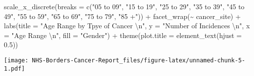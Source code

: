 \documentclass[
]{article}
\newenvironment{Shaded}{\begin{snugshade}}{\end{snugshade}}
\newcommand{\AttributeTok}[1]{\textcolor[rgb]{0.77,0.63,0.00}{#1}}
\newcommand{\FloatTok}[1]{\textcolor[rgb]{0.00,0.00,0.81}{#1}}
\newcommand{\FunctionTok}[1]{\textcolor[rgb]{0.00,0.00,0.00}{#1}}
\newcommand{\NormalTok}[1]{#1}
\newcommand{\SpecialCharTok}[1]{\textcolor[rgb]{0.00,0.00,0.00}{#1}}
\newcommand{\StringTok}[1]{\textcolor[rgb]{0.31,0.60,0.02}{#1}}
\begin{document}
\begin{Shaded}
\begin{Highlighting}[]
  \FunctionTok{scale\_x\_discrete}\NormalTok{(}\AttributeTok{breaks =} \FunctionTok{c}\NormalTok{(}\StringTok{"05 to 09"}\NormalTok{, }\StringTok{"15 to 19"}\NormalTok{, }\StringTok{"25 to 29"}\NormalTok{, }
                              \StringTok{"35 to 39"}\NormalTok{, }\StringTok{"45 to 49"}\NormalTok{, }\StringTok{"55 to 59"}\NormalTok{, }
                              \StringTok{"65 to 69"}\NormalTok{, }\StringTok{"75 to 79"}\NormalTok{, }\StringTok{"85 +"}\NormalTok{)) }\SpecialCharTok{+}
  \FunctionTok{facet\_wrap}\NormalTok{(}\SpecialCharTok{\textasciitilde{}}\NormalTok{ cancer\_site) }\SpecialCharTok{+}
  \FunctionTok{labs}\NormalTok{(}\AttributeTok{title =} \StringTok{"Age Range by Tpye of Cancer }\SpecialCharTok{\textbackslash{}n}\StringTok{"}\NormalTok{,}
       \AttributeTok{y =} \StringTok{"Number of Incidences }\SpecialCharTok{\textbackslash{}n}\StringTok{"}\NormalTok{,}
       \AttributeTok{x =} \StringTok{"Age Range }\SpecialCharTok{\textbackslash{}n}\StringTok{"}\NormalTok{,}
       \AttributeTok{fill =} \StringTok{"Gender"}\NormalTok{) }\SpecialCharTok{+}
  \FunctionTok{theme}\NormalTok{(}\AttributeTok{plot.title =} \FunctionTok{element\_text}\NormalTok{(}\AttributeTok{hjust =} \FloatTok{0.5}\NormalTok{))}
\end{Highlighting}
\end{Shaded}

\texttt{[image: NHS-Borders-Cancer-Report\_files/figure-latex/unnamed-chunk-5-1.pdf]}
\end{document}
